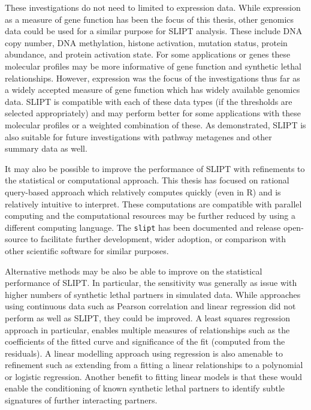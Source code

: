 These investigations do not need to limited to expression data. While expression as a measure of gene function has been the focus of this thesis, other genomics data could be used for a similar purpose for \gls{SLIPT} analysis. These include DNA copy number, DNA methylation, histone activation, mutation status, protein abundance, and protein activation state. For some applications or genes these molecular profiles may be more informative of gene function and synthetic lethal relationships. However, expression was the focus of the investigations thus far as a widely accepted measure of gene function which has widely available genomics data.  \gls{SLIPT} is compatible with each of these data types (if the thresholds are selected appropriately) and may perform better for some applications with these molecular profiles or a weighted combination of these. As demonstrated, \gls{SLIPT} is also suitable for future investigations with pathway metagenes and other summary data as well.

It may also be possible to improve the performance of \gls{SLIPT} with refinements to the statistical or computational approach. This thesis has focused on rational query-based approach which relatively computes quickly (even in R) and is relatively intuitive to interpret. These computations are compatible with parallel computing and the computational resources may be further reduced by using a different computing language. The \texttt{slipt} has been documented and release open-source to facilitate further development, wider adoption, or comparison with other scientific software for similar purposes. 

Alternative methods may be also be able to improve on the statistical performance of \gls{SLIPT}. In particular, the sensitivity was generally as issue with higher numbers of synthetic lethal partners in simulated data. While approaches using continuous data such as Pearson correlation and linear regression did not perform as well as \gls{SLIPT}, they could be improved. A least squares regression approach in particular, enables multiple measures of relationships such as the coefficients of the fitted curve and significance of the fit (computed from the residuals). A linear modelling approach using regression is also amenable to refinement such as extending from a fitting a linear relationships to a polynomial or logistic regression. Another benefit to fitting linear models is that these would enable the conditioning of known synthetic lethal partners to identify subtle signatures of further interacting partners.

